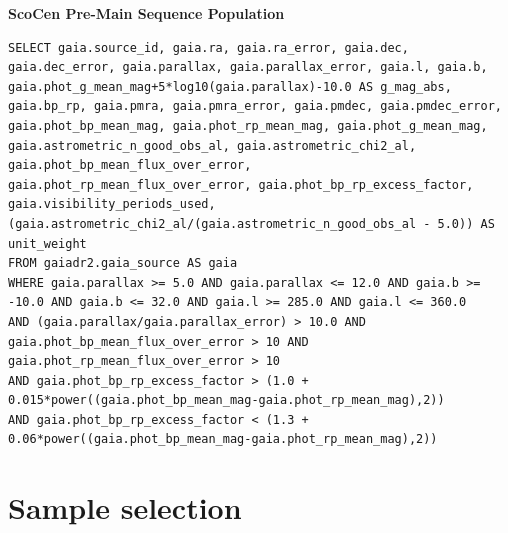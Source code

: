 \textbf{ScoCen Pre-Main Sequence Population}
\begin{lstlisting}[frame = single]
SELECT gaia.source_id, gaia.ra, gaia.ra_error, gaia.dec, gaia.dec_error, gaia.parallax, gaia.parallax_error, gaia.l, gaia.b, 
gaia.phot_g_mean_mag+5*log10(gaia.parallax)-10.0 AS g_mag_abs, 
gaia.bp_rp, gaia.pmra, gaia.pmra_error, gaia.pmdec, gaia.pmdec_error, gaia.phot_bp_mean_mag, gaia.phot_rp_mean_mag, gaia.phot_g_mean_mag, 
gaia.astrometric_n_good_obs_al, gaia.astrometric_chi2_al, gaia.phot_bp_mean_flux_over_error, 
gaia.phot_rp_mean_flux_over_error, gaia.phot_bp_rp_excess_factor,
gaia.visibility_periods_used, (gaia.astrometric_chi2_al/(gaia.astrometric_n_good_obs_al - 5.0)) AS unit_weight 
FROM gaiadr2.gaia_source AS gaia 
WHERE gaia.parallax >= 5.0 AND gaia.parallax <= 12.0 AND gaia.b >= -10.0 AND gaia.b <= 32.0 AND gaia.l >= 285.0 AND gaia.l <= 360.0 
AND (gaia.parallax/gaia.parallax_error) > 10.0 AND gaia.phot_bp_mean_flux_over_error > 10 AND gaia.phot_rp_mean_flux_over_error > 10 
AND gaia.phot_bp_rp_excess_factor > (1.0 + 0.015*power((gaia.phot_bp_mean_mag-gaia.phot_rp_mean_mag),2)) 
AND gaia.phot_bp_rp_excess_factor < (1.3 + 0.06*power((gaia.phot_bp_mean_mag-gaia.phot_rp_mean_mag),2))
\end{lstlisting}

\section{Sample selection}\label{sec:Sample_Selection_1}

